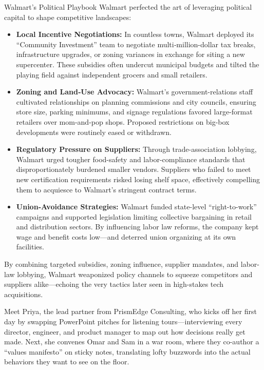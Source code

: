\begin{HistoricalSidebar}{Walmart’s Political Playbook}
  Walmart perfected the art of leveraging political capital to shape competitive landscapes:

  \medskip
  
  \begin{itemize}
    \item \textbf{Local Incentive Negotiations:}  In countless towns, Walmart deployed its “Community Investment” team to negotiate multi‐million-dollar tax breaks, infrastructure upgrades, or zoning variances in exchange for siting a new supercenter.  These subsidies often undercut municipal budgets and tilted the playing field against independent grocers and small retailers.
    \item \textbf{Zoning and Land‐Use Advocacy:}  Walmart’s government-relations staff cultivated relationships on planning commissions and city councils, ensuring store size, parking minimums, and signage regulations favored large-format retailers over mom-and-pop shops.  Proposed restrictions on big-box developments were routinely eased or withdrawn.
    \item \textbf{Regulatory Pressure on Suppliers:}  Through trade-association lobbying, Walmart urged tougher food-safety and labor-compliance standards that disproportionately burdened smaller vendors.  Suppliers who failed to meet new certification requirements risked losing shelf space, effectively compelling them to acquiesce to Walmart’s stringent contract terms.
    \item \textbf{Union‐Avoidance Strategies:}  Walmart funded state-level “right-to-work” campaigns and supported legislation limiting collective bargaining in retail and distribution sectors.  By influencing labor law reforms, the company kept wage and benefit costs low—and deterred union organizing at its own facilities.
  \end{itemize}

  \medskip
  
  By combining targeted subsidies, zoning influence, supplier mandates, and labor-law lobbying, Walmart weaponized policy channels to squeeze competitors and suppliers alike—echoing the very tactics later seen in high-stakes tech acquisitions.  

\end{HistoricalSidebar}

\medskip


Meet Priya, the lead partner from PrismEdge Consulting, who kicks off her first day by swapping PowerPoint pitches for 
listening tours—interviewing every director, engineer, and product manager to map out how decisions really get made. Next, 
she convenes Omar and Sam in a war room, where they co-author a “values manifesto” on sticky notes, translating lofty buzzwords 
into the actual behaviors they want to see on the floor.

